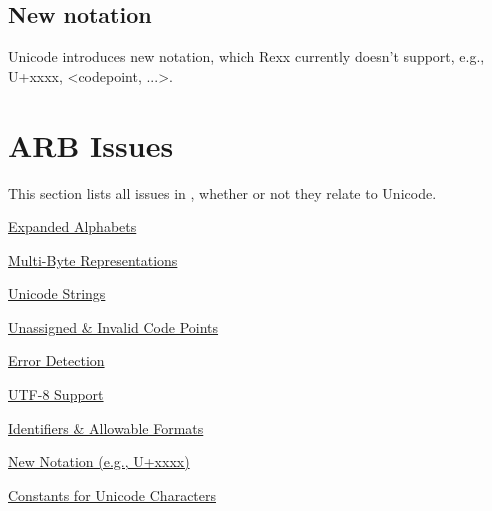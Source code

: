 \documentclass[b4paper]{article}
\begin{document}
\subsection{New notation}
Unicode introduces new notation, which Rexx currently doesn't support, e.g., U+xxxx, <codepoint, ...>.


\section{ARB Issues}
\label{ARBiss}

This section lists all issues in \cite{Req}, whether or not they relate to Unicode.

\begin{issue}[label=I\arabic*,ref=\fbox{I\arabic*}]
\item{\href{https://github.com/users/RexxLA/projects/2/views/6?pane=issue&itemId=35730857}%
{Expanded Alphabets}}
\label{issue:EA}

\item{\href{https://github.com/users/RexxLA/projects/2/views/6?pane=issue&itemId=35730866}%
{Multi-Byte Representations}}
\label{issue:MB}

\item{\href{https://github.com/users/RexxLA/projects/2/views/6?pane=issue&itemId=35730964}%
{Unicode Strings}}
\label{issue:US}

\item{\href{https://github.com/users/RexxLA/projects/2/views/6?pane=issue&itemId=35730903}%
{Unassigned \& Invalid Code Points}}
\label{issue:UICP}

\item{\href{https://github.com/users/RexxLA/projects/2/views/6?pane=issue&itemId=35730928}%
{Error Detection}}
\label{issue:ED}

\item{\href{https://github.com/users/RexxLA/projects/2/views/6?pane=issue&itemId=35730846}%
{UTF-8 Support}}
\label{issue:UTF-8}

\item{\href{https://github.com/users/RexxLA/projects/2/views/6?pane=issue&itemId=35730880}%
{Identifiers \& Allowable Formats}}
\label{issue:IAF}

\item{\href{https://github.com/users/RexxLA/projects/2/views/6?pane=issue&itemId=35730910}%
{New Notation (e.g., U+xxxx)}}
\label{issue:NN}

\item{\href{https://github.com/users/RexxLA/projects/2/views/6?pane=issue&itemId=35730970}%
{Constants for Unicode Characters}}
\label{issue:CUC}


\end{issue}
\end{document}
